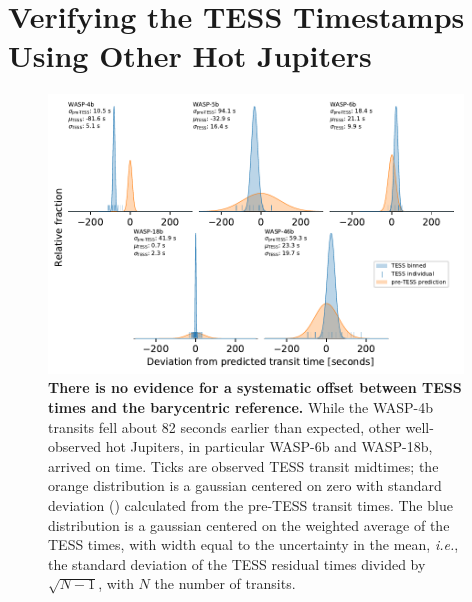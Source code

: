 \documentclass[12pt,twocolumn,tighten]{aastex62}
\begin{document}
{%






\clearpage

                            
 


\appendix

\section{Verifying the TESS Timestamps Using Other Hot Jupiters}
\label{sec:verify_tess}

\begin{figure}[t!]
	\begin{center}
		\leavevmode
		\includegraphics[width=0.98\textwidth]{f8.pdf}
	\end{center}
	\vspace{-0.5cm}
	\caption{
		{\bf There is no evidence for a systematic offset between TESS
			times and the barycentric reference.} While the WASP-4b transits
		fell about 82 seconds earlier than expected, other well-observed
		hot Jupiters, in particular WASP-6b and WASP-18b, arrived on time.
		Ticks are observed TESS transit midtimes; the orange distribution
		is a gaussian centered on zero with standard deviation
		() calculated from the pre-TESS transit
		times.  The blue distribution is a gaussian centered on the
		weighted average of the TESS times, with width equal to the
		uncertainty in the mean, {\it i.e.}, the standard deviation
		of the TESS residual times divided by $\sqrt{N-1}$, with $N$ the
		number of transits.
		\label{fig:hjs}
	}
\end{figure}

}
\end{document}
